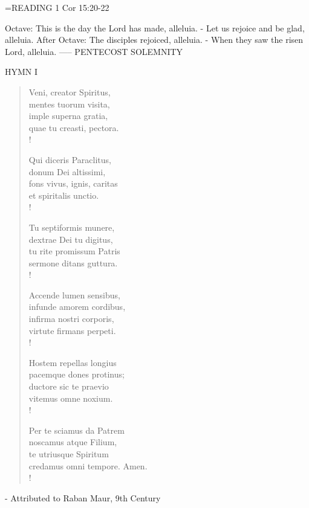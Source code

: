 \hangindent=\parindent \small{READING}    1 Cor 15:20-22 \textbf{   }

Octave:	This is the day the Lord has made, alleluia.
		- Let us rejoice and be glad, alleluia.
After Octave:	The disciples rejoiced, alleluia.
		- When they saw the risen Lord, alleluia.
-----
PENTECOST
SOLEMNITY

\noindent\small{\uppercase{Hymn I}}\normalsize
\begin{verse}
Veni, creator Spiritus,\\
mentes tuorum visita,\\
imple superna gratia,\\
quae tu creasti, pectora.\\!

Qui diceris Paraclitus,\\
donum Dei altissimi,\\
fons vivus, ignis, caritas\\
et spiritalis unctio.\\!

Tu septiformis munere,\\
dextrae Dei tu digitus,\\
tu rite promissum Patris\\
sermone ditans guttura.\\!

Accende lumen sensibus,\\
infunde amorem cordibus,\\
infirma nostri corporis,\\
virtute firmans perpeti.\\!

Hostem repellas longius\\
pacemque dones protinus;\\
ductore sic te praevio\\
vitemus omne noxium.\\!

Per te sciamus da Patrem\\
noscamus atque Filium,\\
te utriusque Spiritum\\
credamus omni tempore. Amen.\\!
\end{verse}
- Attributed to Raban Maur, 9th Century

